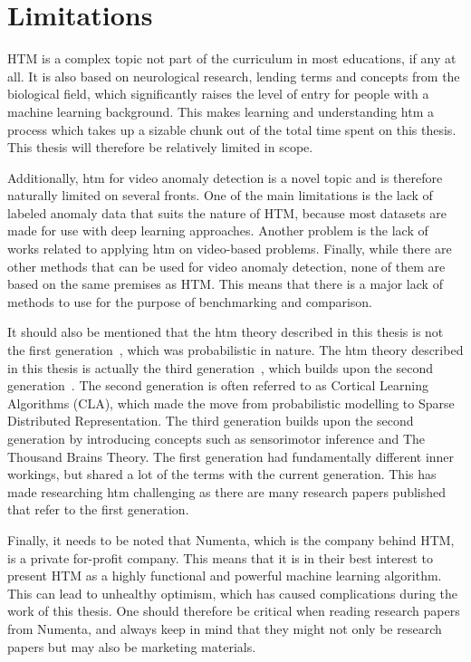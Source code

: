 \section{Limitations}
HTM is a complex topic not part of the curriculum in most educations, if any at all. It is also based on neurological research, lending terms and concepts from the biological field, which significantly raises the level of entry for people with a machine learning background. This makes learning and understanding \gls*{htm} a process which takes up a sizable chunk out of the total time spent on this thesis. This thesis will therefore be relatively limited in scope.
\par
Additionally, \gls*{htm} for video anomaly detection is a novel topic and is therefore naturally limited on several fronts. One of the main limitations is the lack of labeled anomaly data that suits the nature of HTM, because most datasets are made for use with deep learning approaches. Another problem is the lack of works related to applying \gls*{htm} on video-based problems. Finally, while there are other methods that can be used for video anomaly detection, none of them are based on the same premises as HTM. This means that there is a major lack of methods to use for the purpose of benchmarking and comparison.
\par
It should also be mentioned that the \gls*{htm} theory described in this thesis is not the first generation~\cite{htm_zeta1}, which was probabilistic in nature. The \gls*{htm} theory described in this thesis is actually the third generation~\cite{htm_gen3, thousandbrains}, which builds upon the second generation~\cite{htm_gen2_sp,htm_gen2_tm}. The second generation is often referred to as Cortical Learning Algorithms (CLA), which made the move from probabilistic modelling to Sparse Distributed Representation. The third generation builds upon the second generation by introducing concepts such as sensorimotor inference and The Thousand Brains Theory. The first generation had fundamentally different inner workings, but shared a lot of the terms with the current generation. This has made researching  \gls*{htm} challenging as there are many research papers published that refer to the first generation.
\par
Finally, it needs to be noted that Numenta, which is the company behind HTM, is a private for-profit company. This means that it is in their best interest to present HTM as a highly functional and powerful machine learning algorithm. This can lead to unhealthy optimism, which has caused complications during the work of this thesis. One should therefore be critical when reading research papers from Numenta, and always keep in mind that they might not only be research papers but may also be marketing materials.

